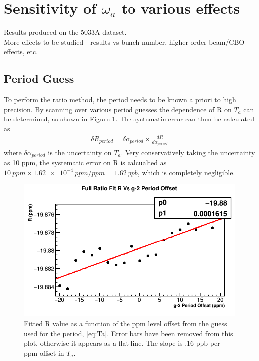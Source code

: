 \section{Sensitivity of \texorpdfstring{$\omega_{a}$}{} to various effects}

	Results produced on the 5033A dataset. \\

	More effects to be studied - results vs bunch number, higher order beam/CBO effects, etc.

	\subsection{\gmtwo Period Guess}
	\label{SubSec:gm2Guess}

		To perform the ratio method, the \gmtwo period needs to be known a priori to high precision. By scanning over various \gmtwo period guesses the dependence of R on $T_{a}$ can be determined, as shown in Figure \ref{fig:gm2PeriodGuess}. The systematic error can then be calculated as 
			\begin{align}
				\delta R_{period} = \delta\alpha_{period} \times \frac{dR}{d\alpha_{period}}
			\end{align}
		where $\delta\alpha_{period}$ is the uncertainty on $T_{a}$. Very conservatively taking the uncertainty as 10 ppm, the systematic error on R is calcualted as $\SI{10}{ppm} \times \SI{1.62e-4}{ppm/ppm} = \SI{1.62}{ppb}$, which is completely negligible.

		\begin{figure}[]
			\centering
			\includegraphics[width=.6\textwidth]{RatioCBO_R_Vs_gm2PeriodGuess_Canv}
		    \caption[gm2PeriodGuess]{Fitted R value as a function of the ppm level offset from the guess used for the \gmtwo period, \ref{eq:Ta}. Error bars have been removed from this plot, otherwise it appears as a flat line. The slope is .16 ppb per ppm offset in $T_{a}$.}
		    \label{fig:gm2PeriodGuess}
		\end{figure}

